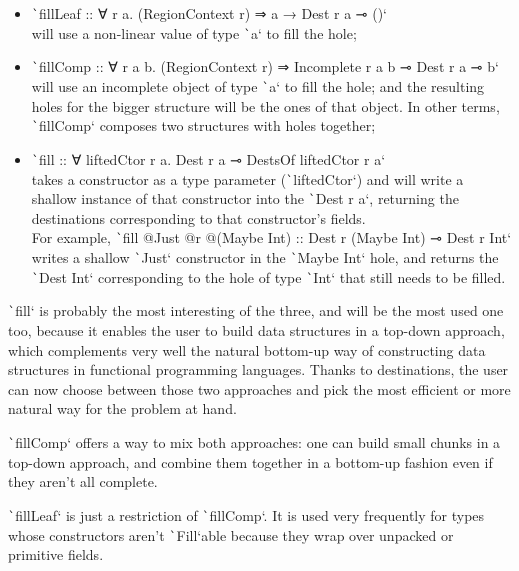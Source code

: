 \documentclass[english]{jflart}
\begin{document}
\begin{itemize}
  \item \texttt`fillLeaf :: ∀ r a. (RegionContext r) ⇒ a → Dest r a ⊸ ()` \\will use a non-linear value of type \texttt`a` to fill the hole;
  \item \texttt`fillComp :: ∀ r a b. (RegionContext r) ⇒ Incomplete r a b ⊸ Dest r a ⊸ b` \\will use an incomplete object of type \texttt`a` to fill the hole; and the resulting holes for the bigger structure will be the ones of that object. In other terms, \texttt`fillComp` composes two structures with holes together;
  \item \texttt`fill :: ∀ liftedCtor r a. Dest r a ⊸ DestsOf liftedCtor r a` \\takes a constructor as a type parameter (\texttt`liftedCtor`) and will write a shallow instance of that constructor into the \texttt`Dest r a`, returning the destinations corresponding to that constructor's fields.\\ For example, \texttt`fill @Just @r @(Maybe Int) :: Dest r (Maybe Int) ⊸ Dest r Int` writes a shallow \texttt`Just` constructor in the \texttt`Maybe Int` hole, and returns the \texttt`Dest Int` corresponding to the hole of type \texttt`Int` that still needs to be filled.
\end{itemize}

\texttt`fill` is probably the most interesting of the three, and will be the most used one too, because it enables the user to build data structures in a top-down approach, which complements very well the natural bottom-up way of constructing data structures in functional programming languages. Thanks to destinations, the user can now choose between those two approaches and pick the most efficient or more natural way for the problem at hand.

\texttt`fillComp` offers a way to mix both approaches: one can build small chunks in a top-down approach, and combine them together in a bottom-up fashion even if they aren't all complete.

\texttt`fillLeaf` is just a restriction of \texttt`fillComp`. It is used very frequently for types whose constructors aren't \texttt`Fill`able because they wrap over unpacked or primitive fields.
\end{document}
